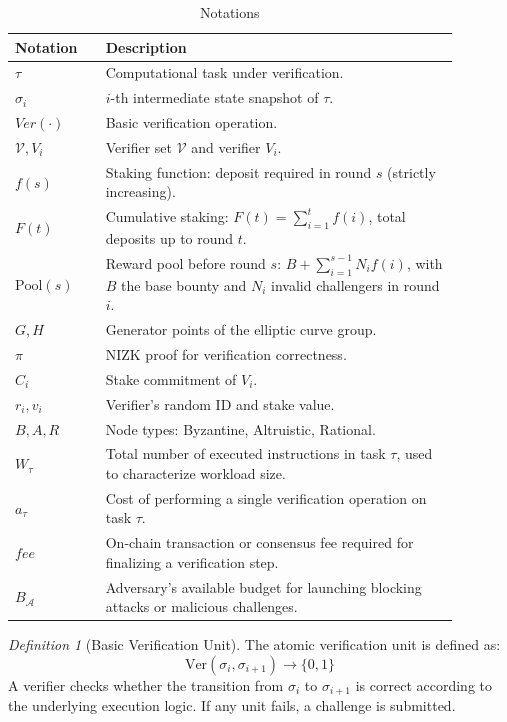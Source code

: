 \documentclass[3p]{elsarticle}
\theoremstyle{remark}
\newtheorem{definition}{Definition}
\begin{document}
\begin{table}[htbp]
    \centering
    \caption{Notations}
    \label{Notations}
    \footnotesize
    \begin{tabular}{>{\centering\arraybackslash}p{0.18\linewidth} >{\arraybackslash}p{0.7\linewidth}}
    \toprule
    \textbf{Notation} & \textbf{Description} \\
    \midrule
    $\tau$ & Computational task under verification. \\
    $\sigma_i$ & $i$-th intermediate state snapshot of $\tau$. \\
    $Ver(\cdot)$ & Basic verification operation. \\
    $\mathcal{V}, V_i$ & Verifier set $\mathcal{V}$ and verifier $V_i$. \\
    $f(s)$ & Staking function: deposit required in round $s$ (strictly increasing). \\
    $F(t)$ & Cumulative staking: $F(t)=\sum_{i=1}^{t} f(i)$, total deposits up to round $t$. \\
    $\mathrm{Pool}(s)$ & Reward pool before round $s$: $B+\sum_{i=1}^{s-1} N_i f(i)$, with $B$ the base bounty and $N_i$ invalid challengers in round $i$. \\
    $G, H$ & Generator points of the elliptic curve group. \\
    $\pi$ & NIZK proof for verification correctness. \\
    $C_i$ & Stake commitment of $V_i$. \\
    $r_i, v_i$ & Verifier’s random ID and stake value. \\
    $B, A, R$ & Node types: Byzantine, Altruistic, Rational. \\
    $W_\tau$ & Total number of executed instructions in task $\tau$, used to characterize workload size. \\
    $a_\tau$ & Cost of performing a single verification operation on task $\tau$. \\
    $\mathit{fee}$ & On-chain transaction or consensus fee required for finalizing a verification step. \\
    $B_{\mathcal{A}}$ & Adversary's available budget for launching blocking attacks or malicious challenges. \\

    \bottomrule
    \end{tabular}
\end{table}

\begin{definition}[Basic Verification Unit]\label{def:basic-unit}
The atomic verification unit is defined as:
\[
\text{Ver}(\sigma_i, \sigma_{i+1}) \rightarrow \{0, 1\}
\]
A verifier checks whether the transition from $\sigma_i$ to $\sigma_{i+1}$ is correct according to the underlying execution logic. If any unit fails, a challenge is submitted.
\end{definition}
\end{document}
